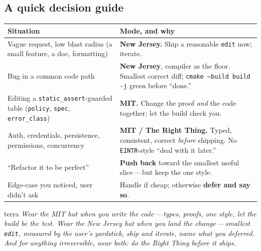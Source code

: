 \documentclass[11pt]{article}
\newenvironment{keybox}[1][The idea]{\begin{sidebox}[#1]{terra}}{\end{sidebox}}
\begin{document}
\subsection{A quick decision guide}
{\small
\begin{longtable}{@{}>{\RaggedRight}p{6.2cm} >{\RaggedRight}p{7.0cm}@{}}
\toprule
\sffamily\bfseries Situation & \sffamily\bfseries Mode, and why \\
\midrule
\endhead
Vague request, low blast radius (a small feature, a doc, formatting) &
\textcolor{terra}{\bfseries New Jersey.} Ship a reasonable \texttt{edit} now;
iterate. \\
Bug in a common code path &
\textcolor{terra}{\bfseries New Jersey}, compiler as the floor. Smallest correct
diff; \texttt{cmake --build build -j} green before ``done.'' \\
Editing a \texttt{static\_assert}-guarded table (\texttt{policy}, \texttt{spec},
\texttt{error\_class}) &
\textcolor{slate}{\bfseries MIT.} Change the proof \emph{and} the code together;
let the build check you. \\
Auth, credentials, persistence, permissions, concurrency &
\textcolor{slate}{\bfseries MIT / The Right Thing.} Typed, consistent, correct
\emph{before} shipping. No \texttt{EINTR}-style ``deal with it later.'' \\
``Refactor it to be perfect'' &
\textcolor{terra}{\bfseries Push back} toward the smallest useful slice\,---\,but
keep the one style. \\
Edge-case you noticed, user didn't ask &
Handle if cheap; otherwise \textbf{defer and say so}. \\
\bottomrule
\end{longtable}}

\begin{keybox}[The agentty mantra]
\itshape Wear the MIT hat when you \emph{write} the code\,---\,types, proofs, one
style, let the build be the test. Wear the New Jersey hat when you \emph{land} the
change\,---\,smallest \texttt{edit}, measured by the user's yardstick, ship and
iterate, name what you deferred. And for anything irreversible, wear both:
do the Right Thing before it ships.
\end{keybox}

\end{document}
